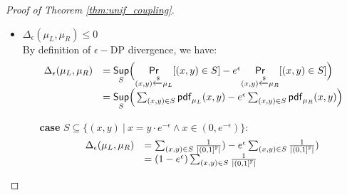 \documentclass[a4paper,11pt]{article}
\begin{document}
\begin{proof}[Proof of Theorem \ref{thm:unif_coupling}]
\begin{itemize}
\begin{itemize}
		\item $\projr(\mu_R) = \mu_2$ 
		\\
		Equivalent to show$\pdf_{\projr(\mu_R)}  = \pdf_{\mu_2}$.
		\\
		By definition of the $\projr$ and $\pdf$ of $\mu_R$, we have $\forall y \in \float$:
		\[
			\pdf_{\projr(\mu_R)}(y) = 
			\begin{cases}
			\sum_{x} 
			\frac{1}{\left \vert (0, 1]^{\float} \right \vert} 
			& x = y \cdot e^{-\epsilon} \land y \in (0, 1)\\
			\sum_{x} 
			\frac{1}{\left \vert [e^{-\epsilon}, 1]^{\float} \right \vert} 
			\cdot
			\frac{1}{\left \vert (0, 1]^{\float} \right \vert} 
			& x \in [e^{-\epsilon}, 1] \land y = 1\\
			0       & o.w.
			\end{cases} 
			= 
			\begin{cases}
			\frac{1}{\left \vert (0, 1]^{\float} \right \vert}
			& y \in (0, 1)\\
			\frac{1}{\left \vert (0, 1]^{\float} \right \vert}  
			& y = 1\\
			0       & o.w.
			\end{cases}
			=
			\pdf_{\mu_2}(y)
		\]
	\end{itemize}	
%
	\item $\Delta_{\epsilon}(\mu_L, \mu_R) \leq 0$
%
\\
	By definition of $\epsilon-$DP divergence, we have:
	 \[
	 \begin{array}{ll}
	 \Delta_{\epsilon}(\mu_L, \mu_R) 
	 & = \underset{S}{\mathsf{Sup}}
	 \Big(
	 \underset{(x,y) \xleftarrow{\$} \mu_L}{\mathsf{Pr}}[(x,y) \in S] - e^{\epsilon} \underset{(x,y) \xleftarrow{\$} \mu_R}{\mathsf{Pr}}[(x,y) \in S]
	 \Big) \\
	 & =\underset{S}{\mathsf{Sup}}
	 \Big(
	 \sum_{(x,y) \in S} \mathsf{pdf}_{\mu_L}(x, y) - e^{\epsilon} \sum_{(x,y) \in S} \mathsf{pdf}_{\mu_R}(x, y)
	 \Big)	 
	 \end{array}
	 \]
	 \begin{itemize}
	 	\item[{\bf case}]
	 	$S \subseteq \{(x, y) ~|~ 
	 	x = y \cdot e^{-\epsilon}  \land x \in (0, e^{-\epsilon}) \}$:
		\[
		 \begin{array}{ll}
		 \Delta_{\epsilon}(\mu_L, \mu_R) 
		 & = 
		 \sum_{(x,y) \in S} \frac{1}{\left \vert (0, 1]^{\mathbb{F}} \right \vert})
		 - e^{\epsilon} \sum_{(x,y) \in S} \frac{1}{\left \vert (0, 1]^{\mathbb{F}} \right \vert}) \\ 
		 & = 
		 (1 - e^{\epsilon})\sum_{(x,y) \in S} \frac{1}{\left \vert (0, 1]^{\mathbb{F}} \right \vert} 

\end{array}\]
\end{itemize}
\end{itemize}
\end{proof}
\end{document}
